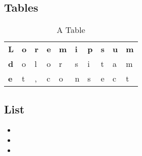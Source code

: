 \documentclass[12pt, a4paper]{article} %
\begin{document}

\subsection{Tables}


\begin{table}[H]
\centering
\caption{A Table}
\label{tab:tbl1}
\begin{tabular}{llllllllll}
\textbf{L}                      & \textbf{o}             & \textbf{r}             & \textbf{e}             & \textbf{m}             & \textbf{i}             & \textbf{p}             & \textbf{s}             & \textbf{u}             & \textbf{m}             \\ \cline{2-10} 
\multicolumn{1}{l|}{\textbf{d}} & \multicolumn{1}{l|}{o} & \multicolumn{1}{l|}{l} & \multicolumn{1}{l|}{o} & \multicolumn{1}{l|}{r} & \multicolumn{1}{l|}{s} & \multicolumn{1}{l|}{i} & \multicolumn{1}{l|}{t} & \multicolumn{1}{l|}{a} & \multicolumn{1}{l|}{m} \\ \cline{2-10} 
\multicolumn{1}{l|}{\textbf{e}} & \multicolumn{1}{l|}{t} & \multicolumn{1}{l|}{,} & \multicolumn{1}{l|}{c} & \multicolumn{1}{l|}{o} & \multicolumn{1}{l|}{n} & \multicolumn{1}{l|}{s} & \multicolumn{1}{l|}{e} & \multicolumn{1}{l|}{c} & \multicolumn{1}{l|}{t} \\ \cline{2-10} 
\end{tabular}
\end{table}


\subsection{List}

\begin{itemize}

\item

\item

\item


\end{itemize}
\end{document}
